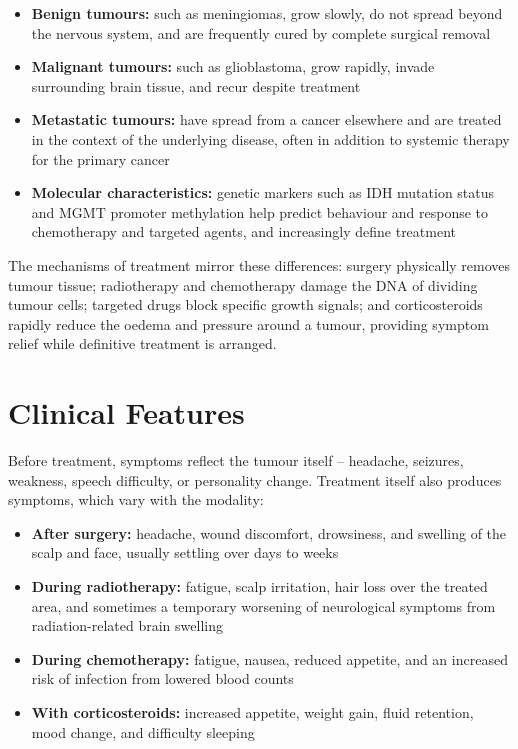 \begin{itemize}
    \item \textbf{Benign tumours:} such as meningiomas, grow slowly, do not spread beyond the nervous system, and are frequently cured by complete surgical removal
    \item \textbf{Malignant tumours:} such as glioblastoma, grow rapidly, invade surrounding brain tissue, and recur despite treatment
    \item \textbf{Metastatic tumours:} have spread from a cancer elsewhere and are treated in the context of the underlying disease, often in addition to systemic therapy for the primary cancer
    \item \textbf{Molecular characteristics:} genetic markers such as IDH mutation status and MGMT promoter methylation help predict behaviour and response to chemotherapy and targeted agents, and increasingly define treatment
\end{itemize}

The mechanisms of treatment mirror these differences: surgery physically removes tumour tissue; radiotherapy and chemotherapy damage the DNA of dividing tumour cells; targeted drugs block specific growth signals; and corticosteroids rapidly reduce the oedema and pressure around a tumour, providing symptom relief while definitive treatment is arranged.

\section*{Clinical Features}
Before treatment, symptoms reflect the tumour itself -- headache, seizures, weakness, speech difficulty, or personality change. Treatment itself also produces symptoms, which vary with the modality:

\begin{itemize}
    \item \textbf{After surgery:} headache, wound discomfort, drowsiness, and swelling of the scalp and face, usually settling over days to weeks
    \item \textbf{During radiotherapy:} fatigue, scalp irritation, hair loss over the treated area, and sometimes a temporary worsening of neurological symptoms from radiation-related brain swelling
    \item \textbf{During chemotherapy:} fatigue, nausea, reduced appetite, and an increased risk of infection from lowered blood counts
    \item \textbf{With corticosteroids:} increased appetite, weight gain, fluid retention, mood change, and difficulty sleeping
\end{itemize}


